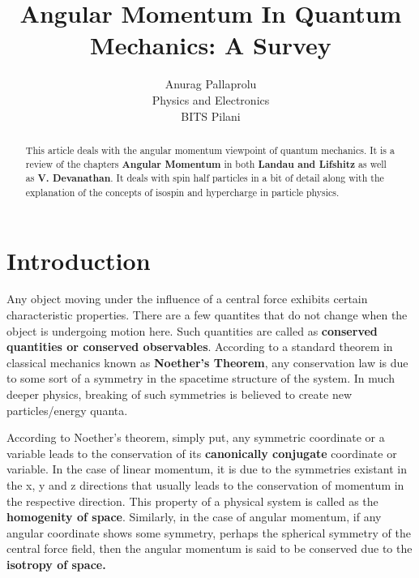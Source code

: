 \documentclass[12pt]{article}
\begin{document}
\title{Angular Momentum In Quantum Mechanics: A Survey}
\author{Anurag Pallaprolu \\Physics and Electronics\\ BITS Pilani}
\maketitle
\begin{abstract}
This article deals with the angular momentum viewpoint of quantum mechanics. It is a review of the chapters \textbf{Angular Momentum} in both \textbf{Landau and Lifshitz} as well as \textbf{V. Devanathan}. It deals with spin half particles in a bit of detail along with the explanation of the concepts of isospin and hypercharge in particle physics.
\end{abstract}
\tableofcontents
\setcounter{tocdepth}{3}
\clearpage
\section*{Introduction}
Any object moving under the influence of a central force exhibits certain characteristic properties. There are a few quantites that do not change when the object is undergoing motion here. Such quantities are called as \textbf{conserved quantities or conserved observables}. According to a standard theorem in classical mechanics known as \textbf{Noether's Theorem}, any conservation law is due to some sort of a symmetry in the spacetime structure of the system. In much deeper physics, breaking of such symmetries is believed to create new particles/energy quanta. 

According to Noether's theorem, simply put, any symmetric coordinate or a variable leads to the conservation of its \textbf{canonically conjugate} coordinate or variable. In the case of linear momentum, it is due to the symmetries existant in the x, y and z directions that usually leads to the conservation of momentum in the respective direction. This property of a physical system is called as the \textbf{homogenity of space}. Similarly, in the case of angular momentum, if any angular coordinate shows some symmetry, perhaps the spherical symmetry of the central force field, then the angular momentum is said to be conserved due to the \textbf{isotropy of space.}
\end{document}
